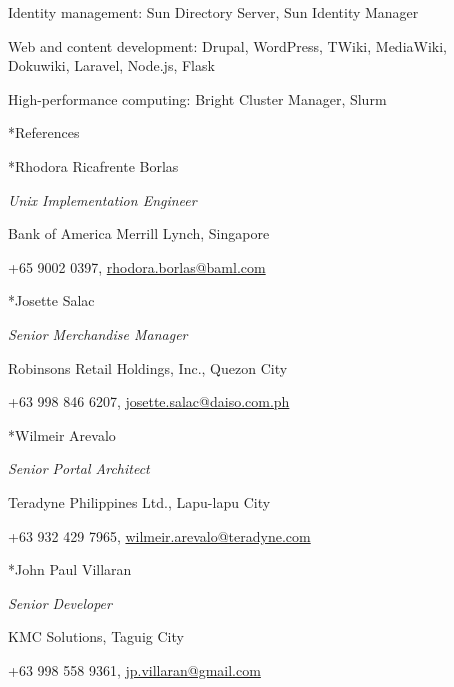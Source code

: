 \documentclass[10pt, a4paper, final]{article}
\begin{document}
\begin{section}
\begin{subsection}
\begin{compactitem}
      \item Identity management: Sun Directory Server, Sun Identity Manager
      \item Web and content development: Drupal, WordPress, TWiki, MediaWiki, Dokuwiki, Laravel, Node.js, Flask
      \item High-performance computing: Bright Cluster Manager, Slurm
    \end{compactitem}
  \end{subsection}
\end{section}

\vspace{2em}

\begin{section}*{References}
  \begin{subsection}*{Rhodora Ricafrente Borlas}
    \begin{compactitem}
      \item[] \textit{Unix Implementation Engineer}
      \item[] Bank of America Merrill Lynch, Singapore
      \item[] +65 9002 0397, \href{mailto:rhodora.borlas@baml.com}{rhodora.borlas@baml.com}
    \end{compactitem}
  \end{subsection}

  \begin{subsection}*{Josette Salac}
    \begin{compactitem}
      \item[] \textit{Senior Merchandise Manager}
      \item[] Robinsons Retail Holdings, Inc., Quezon City
      \item[] +63 998 846 6207, \href{mailto:josette.salac@daiso.com.ph}{josette.salac@daiso.com.ph}
    \end{compactitem}
  \end{subsection}

  \begin{subsection}*{Wilmeir Arevalo}
    \begin{compactitem}
      \item[] \textit{Senior Portal Architect}
      \item[] Teradyne Philippines Ltd., Lapu-lapu City
      \item[] +63 932 429 7965, \href{mailto:wilmeir.arevalo@teradyne.com}{wilmeir.arevalo@teradyne.com}
    \end{compactitem}
  \end{subsection}

  \begin{subsection}*{John Paul Villaran}
    \begin{compactitem}
      \item[] \textit{Senior Developer}
      \item[] KMC Solutions, Taguig City
      \item[] +63 998 558 9361, \href{mailto:jp.villaran@gmail.com}{jp.villaran@gmail.com}
    \end{compactitem}
  \end{subsection}
\end{section}
\vspace{1em}
\end{document}
